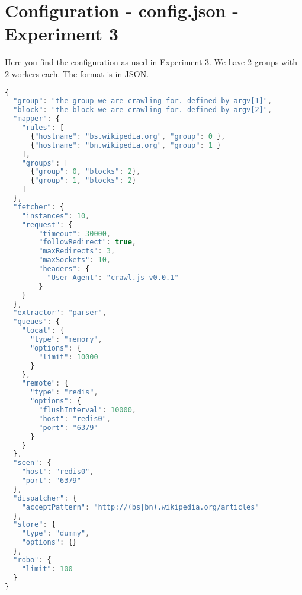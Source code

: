 
\chapter{Configuration - config.json - Experiment 3} %
\label{appendix:config.json} %

Here you find the configuration as used in Experiment 3. We have 2 groups with 2 workers each.
\newline
The format is in JSON.\cite{wiki:json}
\begin{lstlisting}[language=JavaScript]
{
  "group": "the group we are crawling for. defined by argv[1]",
  "block": "the block we are crawling for. defined by argv[2]",
  "mapper": {
    "rules": [
      {"hostname": "bs.wikipedia.org", "group": 0 },
      {"hostname": "bn.wikipedia.org", "group": 1 }
    ],
    "groups": [
      {"group": 0, "blocks": 2},
      {"group": 1, "blocks": 2}
    ]
  },
  "fetcher": {
    "instances": 10,
    "request": {
        "timeout": 30000,
        "followRedirect": true,
        "maxRedirects": 3,
        "maxSockets": 10,
        "headers": {
          "User-Agent": "crawl.js v0.0.1"
        }
    }
  },
  "extractor": "parser",
  "queues": {
    "local": {
      "type": "memory",
      "options": {
        "limit": 10000
      }
    },
    "remote": {
      "type": "redis",
      "options": {
        "flushInterval": 10000,
        "host": "redis0",
        "port": "6379"
      }
    }
  },
  "seen": {
    "host": "redis0",
    "port": "6379"
  },
  "dispatcher": {
    "acceptPattern": "http://(bs|bn).wikipedia.org/articles"
  },
  "store": {
    "type": "dummy",
    "options": {}
  },
  "robo": {
    "limit": 100
  }
}
\end{lstlisting}